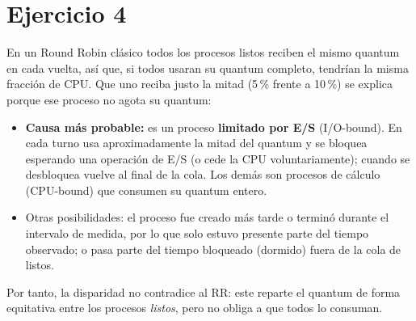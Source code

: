\documentclass[10pt, a4paper]{article}
\begin{document}
\section*{Ejercicio 4}\nopagebreak[4]
\noindent{}\par\nopagebreak[4]\vspace{4pt}
\noindent\begin{minipage}{\linewidth}\small
En un Round Robin clásico todos los procesos listos reciben el mismo quantum en cada vuelta, así que, si todos usaran su quantum completo, tendrían la misma fracción de CPU. Que uno reciba justo la mitad (5\,\% frente a 10\,\%) se explica porque ese proceso no agota su quantum:
\begin{itemize}\setlength\itemsep{1pt}
\item \textbf{Causa más probable:} es un proceso \textbf{limitado por E/S} (I/O-bound). En cada turno usa aproximadamente la mitad del quantum y se bloquea esperando una operación de E/S (o cede la CPU voluntariamente); cuando se desbloquea vuelve al final de la cola. Los demás son procesos de cálculo (CPU-bound) que consumen su quantum entero.
\item Otras posibilidades: el proceso fue creado más tarde o terminó durante el intervalo de medida, por lo que solo estuvo presente parte del tiempo observado; o pasa parte del tiempo bloqueado (dormido) fuera de la cola de listos.
\end{itemize}
Por tanto, la disparidad no contradice al RR: este reparte el quantum de forma equitativa entre los procesos \emph{listos}, pero no obliga a que todos lo consuman.
\end{minipage}\par\vspace{0.3cm}
\end{document}
